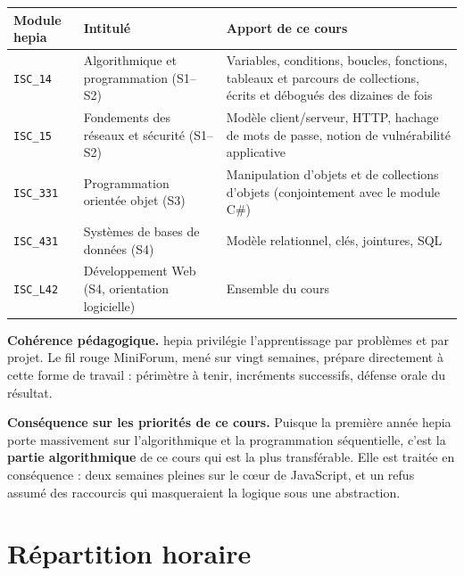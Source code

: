 \documentclass[a4paper,11pt]{article}
\begin{document}
\begin{center}
\begin{tabularx}{\linewidth}{lXX}
  \toprule
  \rowcolor{accentBlue}
  \color{white}\textbf{Module hepia} &
  \color{white}\textbf{Intitulé} &
  \color{white}\textbf{Apport de ce cours} \\
  \midrule
  \rowcolor{cfptGrey}
  \texttt{ISC\_14} & Algorithmique et programmation (S1--S2) & Variables, conditions, boucles, fonctions, tableaux et parcours de collections, écrits et débogués des dizaines de fois \\
  \texttt{ISC\_15} & Fondements des réseaux et sécurité (S1--S2) & Modèle client/serveur, HTTP, hachage de mots de passe, notion de vulnérabilité applicative \\
  \rowcolor{cfptGrey}
  \texttt{ISC\_331} & Programmation orientée objet (S3) & Manipulation d'objets et de collections d'objets (conjointement avec le module C\#) \\
  \texttt{ISC\_431} & Systèmes de bases de données (S4) & Modèle relationnel, clés, jointures, SQL \\
  \rowcolor{cfptGrey}
  \texttt{ISC\_L42} & Développement Web (S4, orientation logicielle) & Ensemble du cours \\
  \bottomrule
\end{tabularx}
\end{center}

\medskip
\noindent\textbf{Cohérence pédagogique.} hepia privilégie l'apprentissage par problèmes et par projet. Le fil rouge MiniForum, mené sur vingt semaines, prépare directement à cette forme de travail : périmètre à tenir, incréments successifs, défense orale du résultat.

\medskip
\noindent\textbf{Conséquence sur les priorités de ce cours.} Puisque la première année hepia porte massivement sur l'algorithmique et la programmation séquentielle, c'est la \textbf{partie algorithmique} de ce cours qui est la plus transférable. Elle est traitée en conséquence : deux semaines pleines sur le cœur de JavaScript, et un refus assumé des raccourcis qui masqueraient la logique sous une abstraction.

\newpage

\section{Répartition horaire}
\end{document}
